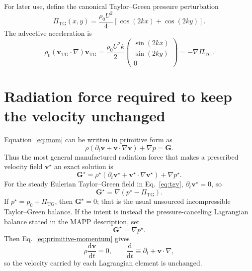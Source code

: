 \documentclass[11pt]{article}
\newcommand{\dd}{\mathrm{d}}
\newcommand{\Grad}{\nabla}
\newcommand{\Gmom}{\bm{G}}
\begin{document}
For later use, define the canonical Taylor--Green pressure perturbation
\begin{equation}
  \Pi_{\mathrm{TG}}(x,y)
  =
  \frac{\rho_0 U^2}{4}
  \left[\cos(2kx)+\cos(2ky)\right].
  \label{eq:tg-pressure}
\end{equation}
The advective acceleration is
\begin{equation}
  \rho_0(\bm{v}_{\mathrm{TG}}\cdot\Grad)\bm{v}_{\mathrm{TG}}
  =
  \frac{\rho_0 U^2 k}{2}
  \begin{pmatrix}
    \sin(2kx)\\
    \sin(2ky)\\
    0
  \end{pmatrix}
  = -\Grad \Pi_{\mathrm{TG}}.
  \label{eq:tgv-advective-acceleration}
\end{equation}

\section{Radiation force required to keep the velocity unchanged}

Equation~\eqref{eq:mom} can be written in primitive form as
\begin{equation}
  \rho\left(\partial_t\bm{v} + \bm{v}\cdot\Grad\bm{v}\right) + \Grad p
  = \Gmom.
  \label{eq:primitive-momentum}
\end{equation}
Thus the most general manufactured radiation force that makes a prescribed
velocity field \(\bm{v}^\star\) an exact solution is
\begin{equation}
  \Gmom^\star
  =
  \rho^\star
  \left(\partial_t\bm{v}^\star + \bm{v}^\star\cdot\Grad\bm{v}^\star\right)
  + \Grad p^\star.
  \label{eq:general-force}
\end{equation}
For the steady Eulerian Taylor--Green field in Eq.~\eqref{eq:tgv},
\(\partial_t\bm{v}^\star=0\), so
\begin{equation}
  \Gmom^\star
  =
  \Grad\left(p^\star - \Pi_{\mathrm{TG}}\right).
  \label{eq:eulerian-force}
\end{equation}
If \(p^\star=p_0+\Pi_{\mathrm{TG}}\), then
\(\Gmom^\star=0\); that is the usual unsourced incompressible
Taylor--Green balance.  If the intent is instead the pressure-canceling
Lagrangian balance stated in the MAPP description, set
\begin{equation}
  \Gmom^\star = \Grad p^\star.
  \label{eq:pressure-canceling-force}
\end{equation}
Then Eq.~\eqref{eq:primitive-momentum} gives
\begin{equation}
  \rho\frac{\dd\bm{v}}{\dd t}=0,
  \qquad
  \frac{\dd}{\dd t}\equiv\partial_t+\bm{v}\cdot\Grad,
  \label{eq:lagrangian-velocity-constant}
\end{equation}
so the velocity carried by each Lagrangian element is unchanged.
\end{document}
